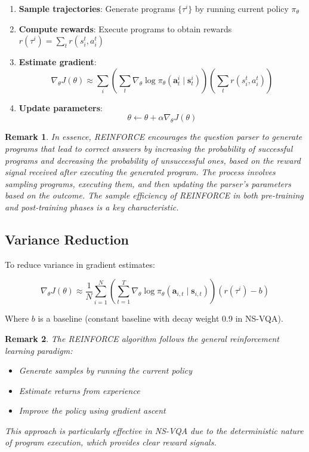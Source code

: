 \documentclass[10pt, oneside]{article}
\newtheorem{rem}{Remark}
\begin{document}
\begin{enumerate}
    \item \textbf{Sample trajectories}: Generate programs $\{\tau^i\}$ by running current policy $\pi_\theta$
    \item \textbf{Compute rewards}: Execute programs to obtain rewards $r(\tau^i) = \sum_t r(s_i^t,a_i^t)$
    \item \textbf{Estimate gradient}:
    \[
    \nabla_{\theta} J(\theta) \approx \sum_{i} \left( \sum_{t} \nabla_{\theta} \log \pi_{\theta}(\mathbf{a}_{t}^{i} \mid \mathbf{s}_{t}^{i}) \right) \left(\sum_t r(s_i^t,a_i^t)\right)
    \]
    \item \textbf{Update parameters}:
    \[
    \theta \leftarrow \theta + \alpha \nabla_{\theta} J(\theta)
    \]
\end{enumerate}

\begin{rem}
In essence, REINFORCE encourages the question parser to generate programs that lead to correct answers by increasing the probability of successful programs and decreasing the probability of unsuccessful ones, based on the reward signal received after executing the generated program. The process involves sampling programs, executing them, and then updating the parser's parameters based on the outcome. The sample efficiency of REINFORCE in both pre-training and post-training phases is a key characteristic.
\end{rem}


\subsection{Variance Reduction}
To reduce variance in gradient estimates:

\begin{equation}
    \nabla_{\theta} J(\theta) \approx \frac{1}{N} \sum_{i=1}^{N} \left( \sum_{t=1}^{T} \nabla_{\theta} \log \pi_{\theta}(\mathbf{a}_{i,t} \mid \mathbf{s}_{i,t}) \right) (r(\tau^i) - b)
\end{equation}

Where $b$ is a baseline (constant baseline with decay weight 0.9 in NS-VQA).

\begin{rem}
The REINFORCE algorithm follows the general reinforcement learning paradigm:
\begin{itemize}
    \item Generate samples by running the current policy
    \item Estimate returns from experience
    \item Improve the policy using gradient ascent
\end{itemize}
This approach is particularly effective in NS-VQA due to the deterministic nature of program execution, which provides clear reward signals.
\end{rem}
\end{document}
